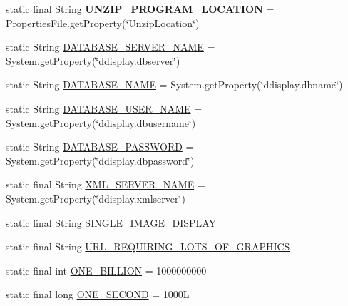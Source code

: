 \begin{DoxyCompactItemize}
\item 
\hypertarget{classgov_1_1fnal_1_1ppd_1_1dd_1_1GlobalVariables_a3b3484a9eaa4099af2a1ade1fa0f94a5}{static final String {\bfseries U\-N\-Z\-I\-P\-\_\-\-P\-R\-O\-G\-R\-A\-M\-\_\-\-L\-O\-C\-A\-T\-I\-O\-N} = Properties\-File.\-get\-Property(\char`\"{}Unzip\-Location\char`\"{})}\label{classgov_1_1fnal_1_1ppd_1_1dd_1_1GlobalVariables_a3b3484a9eaa4099af2a1ade1fa0f94a5}

\item 
static String \hyperlink{classgov_1_1fnal_1_1ppd_1_1dd_1_1GlobalVariables_a84bb07dcee9c961579282f50a5031c0e}{D\-A\-T\-A\-B\-A\-S\-E\-\_\-\-S\-E\-R\-V\-E\-R\-\_\-\-N\-A\-M\-E} = System.\-get\-Property(\char`\"{}ddisplay.\-dbserver\char`\"{})
\item 
static String \hyperlink{classgov_1_1fnal_1_1ppd_1_1dd_1_1GlobalVariables_a737045676a15c469e5cb486d80c08043}{D\-A\-T\-A\-B\-A\-S\-E\-\_\-\-N\-A\-M\-E} = System.\-get\-Property(\char`\"{}ddisplay.\-dbname\char`\"{})
\item 
static String \hyperlink{classgov_1_1fnal_1_1ppd_1_1dd_1_1GlobalVariables_a1b5c1519d1964bf42b3fe4908ae6d444}{D\-A\-T\-A\-B\-A\-S\-E\-\_\-\-U\-S\-E\-R\-\_\-\-N\-A\-M\-E} = System.\-get\-Property(\char`\"{}ddisplay.\-dbusername\char`\"{})
\item 
static String \hyperlink{classgov_1_1fnal_1_1ppd_1_1dd_1_1GlobalVariables_ae63bd973c9c02683b0c4964179ceefe0}{D\-A\-T\-A\-B\-A\-S\-E\-\_\-\-P\-A\-S\-S\-W\-O\-R\-D} = System.\-get\-Property(\char`\"{}ddisplay.\-dbpassword\char`\"{})
\item 
static final String \hyperlink{classgov_1_1fnal_1_1ppd_1_1dd_1_1GlobalVariables_a1b1eb1c9096380d09b968cd474e8bb86}{X\-M\-L\-\_\-\-S\-E\-R\-V\-E\-R\-\_\-\-N\-A\-M\-E} = System.\-get\-Property(\char`\"{}ddisplay.\-xmlserver\char`\"{})
\item 
static final String \hyperlink{classgov_1_1fnal_1_1ppd_1_1dd_1_1GlobalVariables_ab018dd06fadda0d1bc99e7de66894e84}{S\-I\-N\-G\-L\-E\-\_\-\-I\-M\-A\-G\-E\-\_\-\-D\-I\-S\-P\-L\-A\-Y}
\item 
static final String \hyperlink{classgov_1_1fnal_1_1ppd_1_1dd_1_1GlobalVariables_aaf1f42e774f4d514f50578db3ea33733}{U\-R\-L\-\_\-\-R\-E\-Q\-U\-I\-R\-I\-N\-G\-\_\-\-L\-O\-T\-S\-\_\-\-O\-F\-\_\-\-G\-R\-A\-P\-H\-I\-C\-S}
\item 
static final int \hyperlink{classgov_1_1fnal_1_1ppd_1_1dd_1_1GlobalVariables_a271c983add4bac415412025c8ac2f4cc}{O\-N\-E\-\_\-\-B\-I\-L\-L\-I\-O\-N} = 1000000000
\item 
static final long \hyperlink{classgov_1_1fnal_1_1ppd_1_1dd_1_1GlobalVariables_a3718d8133f257fcc337f5131c8e22d48}{O\-N\-E\-\_\-\-S\-E\-C\-O\-N\-D} = 1000\-L

\end{DoxyCompactItemize}
